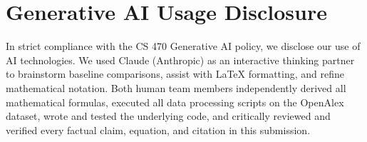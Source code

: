\section{Generative AI Usage Disclosure}

In strict compliance with the CS 470 Generative AI policy, we disclose our use of AI technologies. We used Claude (Anthropic) as an interactive thinking partner to brainstorm baseline comparisons, assist with LaTeX formatting, and refine mathematical notation. Both human team members independently derived all mathematical formulas, executed all data processing scripts on the OpenAlex dataset, wrote and tested the underlying code, and critically reviewed and verified every factual claim, equation, and citation in this submission.




